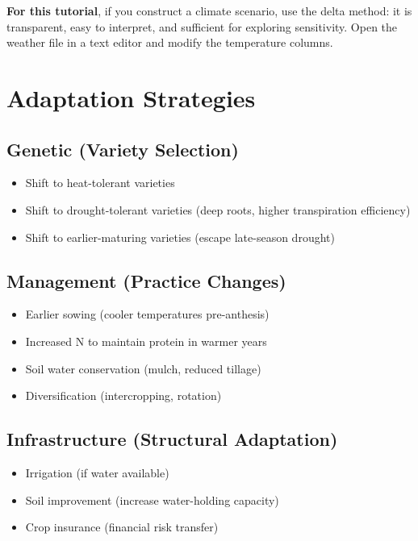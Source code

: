 \begin{tipbox}
\textbf{For this tutorial}, if you construct a climate scenario, use the delta method: it is transparent, easy to interpret, and sufficient for exploring sensitivity. Open the  weather file in a text editor and modify the temperature columns.
\end{tipbox}

\section{Adaptation Strategies}

\subsection{Genetic (Variety Selection)}

\begin{itemize}
  \item Shift to heat-tolerant varieties
  \item Shift to drought-tolerant varieties (deep roots, higher transpiration efficiency)
  \item Shift to earlier-maturing varieties (escape late-season drought)
\end{itemize}

\subsection{Management (Practice Changes)}

\begin{itemize}
  \item Earlier sowing (cooler temperatures pre-anthesis)
  \item Increased N to maintain protein in warmer years
  \item Soil water conservation (mulch, reduced tillage)
  \item Diversification (intercropping, rotation)
\end{itemize}

\subsection{Infrastructure (Structural Adaptation)}

\begin{itemize}
  \item Irrigation (if water available)
  \item Soil improvement (increase water-holding capacity)
  \item Crop insurance (financial risk transfer)
\end{itemize}

